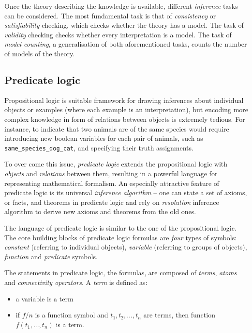 Once the theory describing the knowledge is available, different \textit{inference} tasks can be considered.
The most fundamental task is that of \textit{consistency} or \textit{satisfiability} checking, which checks whether the theory has a model.
The task of \textit{validity} checking checks whether every interpretation is a model.
The task of \textit{model counting}, a generalisation of both aforementioned tasks, counts the number of models of the theory.









\subsection{Predicate logic}


Propositional logic is suitable framework for drawing inferences about individual objects or examples (where each example is an interpretation), but encoding more complex knowledge in form of relations between objects is extremely tedious.
For instance, to indicate that two animals are of the same species would require introducing new boolean variables for each pair of animals, such as \texttt{same\_species\_dog\_cat}, and specifying their truth assignments.



To over come this issue, \textit{predicate logic} extends the propositional logic with \textit{objects} and \textit{relations} between them, resulting in a powerful language for representing mathematical formalism.
An especially attractive feature of predicate logic is its universal \textit{inference algorithm} -- one can state a set of axioms, or facts, and theorems in predicate logic and rely on \textit{resolution} \cite{Robinson:1965:Resolution} inference algorithm to derive new axioms and theorems from the old ones.



The language of predicate logic is similar to the one of the propositional logic.
The core building blocks of predicate logic formulas are \textit{four} types of symbols: \textit{constant} (referring to individual objects), \textit{variable} (referring to groups of objects), \textit{function} and \textit{predicate} symbols.


The statements in predicate logic, the formulas, are composed of \textit{terms}, \textit{atoms} and \textit{connectivity operators}.
A \textit{term} is defined as:
\begin{itemize}
	\item a variable is a term
	\item if $f / n$ is a function symbol and $t_1,t_2,...,t_n$ are terms, then function $f(t_1,...,t_n)$ is a term.
\end{itemize}


